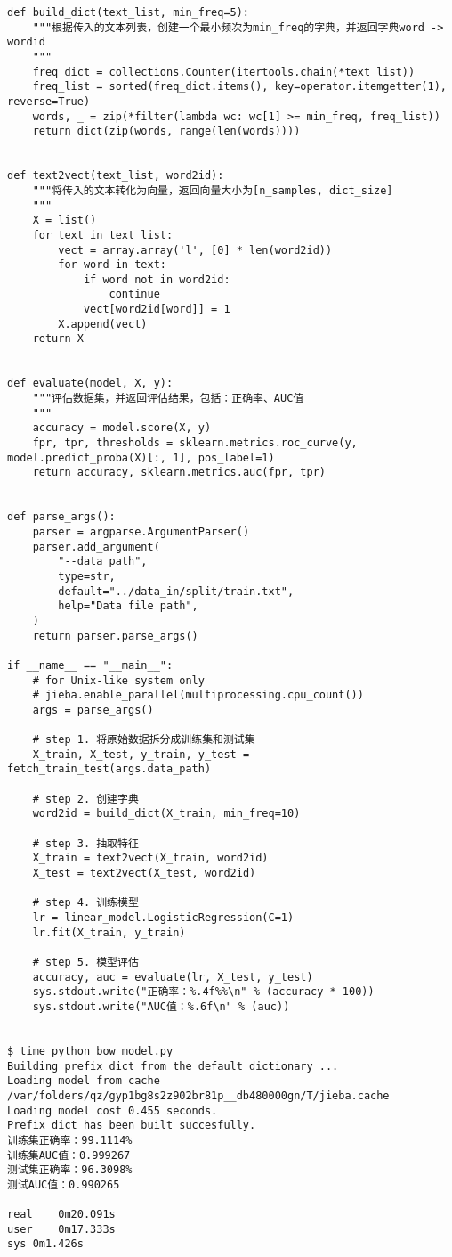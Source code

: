 \documentclass[10pt,a4paper]{ctexbook}
\begin{document}
\begin{verbatim}
def build_dict(text_list, min_freq=5):
    """根据传入的文本列表，创建一个最小频次为min_freq的字典，并返回字典word -> wordid
    """
    freq_dict = collections.Counter(itertools.chain(*text_list))
    freq_list = sorted(freq_dict.items(), key=operator.itemgetter(1), reverse=True)
    words, _ = zip(*filter(lambda wc: wc[1] >= min_freq, freq_list))
    return dict(zip(words, range(len(words))))


def text2vect(text_list, word2id):
    """将传入的文本转化为向量，返回向量大小为[n_samples, dict_size]
    """
    X = list()
    for text in text_list:
        vect = array.array('l', [0] * len(word2id))
        for word in text:
            if word not in word2id:
                continue
            vect[word2id[word]] = 1
        X.append(vect)
    return X


def evaluate(model, X, y):
    """评估数据集，并返回评估结果，包括：正确率、AUC值
    """
    accuracy = model.score(X, y)
    fpr, tpr, thresholds = sklearn.metrics.roc_curve(y, model.predict_proba(X)[:, 1], pos_label=1)
    return accuracy, sklearn.metrics.auc(fpr, tpr)


def parse_args():
    parser = argparse.ArgumentParser()
    parser.add_argument(
        "--data_path",
        type=str,
        default="../data_in/split/train.txt",
        help="Data file path",
    )
    return parser.parse_args()

if __name__ == "__main__":
    # for Unix-like system only
    # jieba.enable_parallel(multiprocessing.cpu_count())
    args = parse_args()

    # step 1. 将原始数据拆分成训练集和测试集
    X_train, X_test, y_train, y_test = fetch_train_test(args.data_path)

    # step 2. 创建字典
    word2id = build_dict(X_train, min_freq=10)

    # step 3. 抽取特征
    X_train = text2vect(X_train, word2id)
    X_test = text2vect(X_test, word2id)

    # step 4. 训练模型
    lr = linear_model.LogisticRegression(C=1)
    lr.fit(X_train, y_train)

    # step 5. 模型评估
    accuracy, auc = evaluate(lr, X_test, y_test)
    sys.stdout.write("正确率：%.4f%%\n" % (accuracy * 100))
    sys.stdout.write("AUC值：%.6f\n" % (auc))


$ time python bow_model.py 
Building prefix dict from the default dictionary ...
Loading model from cache /var/folders/qz/gyp1bg8s2z902br81p__db480000gn/T/jieba.cache
Loading model cost 0.455 seconds.
Prefix dict has been built succesfully.
训练集正确率：99.1114%
训练集AUC值：0.999267
测试集正确率：96.3098%
测试AUC值：0.990265

real    0m20.091s
user    0m17.333s
sys 0m1.426s
\end{verbatim}
\end{document}

